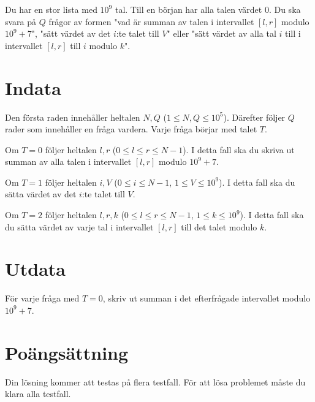 Du har en stor lista med $10^9$ tal. Till en början har alla talen värdet $0$. Du ska svara på $Q$
frågor av formen "vad är summan av talen i intervallet $[l,r]$ modulo $10^9+7$",
"sätt värdet av det $i$:te talet till $V$" eller "sätt värdet av alla tal $i$ till i intervallet $[l,r]$
till $i$ modulo $k$".

\section*{Indata}
Den första raden innehåller heltalen $N, Q$ ($1 \leq N, Q \leq 10^5$).
Därefter följer $Q$ rader som innehåller en fråga vardera. Varje fråga börjar med talet $T$.

Om $T=0$ följer heltalen $l,r$ ($0 \leq l \leq r \leq N - 1$). I detta fall ska du skriva ut summan av alla talen i intervallet $[l,r]$ modulo $10^9+7$.

Om $T=1$ följer heltalen $i, V$ ($0 \leq i \leq N - 1$, $1 \leq V \leq 10^9$). I detta fall ska du sätta värdet av det $i$:te talet till $V$.

Om $T=2$ följer heltalen $l,r,k$ ($0 \leq l \leq r \leq N-1$, $1 \leq k \leq 10^9$). I detta fall ska du sätta värdet av varje tal i intervallet $[l,r]$ till det talet modulo $k$.

\section*{Utdata}
För varje fråga med $T=0$, skriv ut summan i det efterfrågade intervallet modulo $10^9+7$.

\section*{Poängsättning}
Din lösning kommer att testas på flera testfall.
\noindent
För att lösa problemet måste du klara alla testfall.
